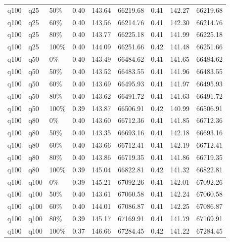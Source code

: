 \begin{longtable}{lllrrrrrr}
  q100 & q25 & 50\% & 0.40 & 143.64 & 66219.68 & 0.41 & 142.27 & 66219.68 \\ 
  q100 & q25 & 60\% & 0.40 & 143.56 & 66214.76 & 0.41 & 142.30 & 66214.76 \\ 
  q100 & q25 & 80\% & 0.40 & 143.77 & 66225.18 & 0.41 & 141.99 & 66225.18 \\ 
  q100 & q25 & 100\% & 0.40 & 144.09 & 66251.66 & 0.42 & 141.48 & 66251.66 \\ 
  q100 & q50 & 0\% & 0.40 & 143.49 & 66484.62 & 0.41 & 141.65 & 66484.62 \\ 
  q100 & q50 & 50\% & 0.40 & 143.52 & 66483.55 & 0.41 & 141.96 & 66483.55 \\ 
  q100 & q50 & 60\% & 0.40 & 143.69 & 66495.93 & 0.41 & 141.97 & 66495.93 \\ 
  q100 & q50 & 80\% & 0.40 & 143.62 & 66491.72 & 0.41 & 141.63 & 66491.72 \\ 
  q100 & q50 & 100\% & 0.39 & 143.87 & 66506.91 & 0.42 & 140.99 & 66506.91 \\ 
  q100 & q80 & 0\% & 0.40 & 143.60 & 66712.36 & 0.41 & 141.85 & 66712.36 \\ 
  q100 & q80 & 50\% & 0.40 & 143.35 & 66693.16 & 0.41 & 142.18 & 66693.16 \\ 
  q100 & q80 & 60\% & 0.40 & 143.66 & 66712.41 & 0.41 & 142.19 & 66712.41 \\ 
  q100 & q80 & 80\% & 0.40 & 143.86 & 66719.35 & 0.41 & 141.86 & 66719.35 \\ 
  q100 & q80 & 100\% & 0.39 & 145.04 & 66822.81 & 0.42 & 141.32 & 66822.81 \\ 
  q100 & q100 & 0\% & 0.39 & 145.21 & 67092.26 & 0.41 & 142.01 & 67092.26 \\ 
  q100 & q100 & 50\% & 0.40 & 143.61 & 67060.58 & 0.41 & 142.24 & 67060.58 \\ 
  q100 & q100 & 60\% & 0.40 & 144.01 & 67086.87 & 0.41 & 142.25 & 67086.87 \\ 
  q100 & q100 & 80\% & 0.39 & 145.17 & 67169.91 & 0.41 & 141.79 & 67169.91 \\ 
  q100 & q100 & 100\% & 0.37 & 146.66 & 67284.45 & 0.42 & 141.22 & 67284.45 \\ 
  \hline
\end{longtable}
\endgroup
